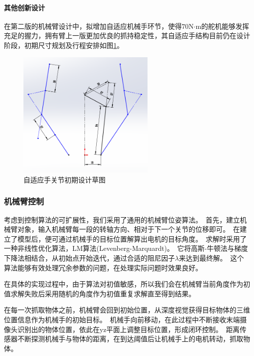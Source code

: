 \paragraph{其他创新设计}

在第二版的机械臂设计中，拟增加自适应机械手环节，使得$70$N$\cdot$m的舵机能够发挥充足的握力，拥有臂上一版更加优良的抓持稳定性，其自适应手结构目前仍在设计阶段，初期尺寸规划及行程安排如图\ref{fig:arm8}。

\begin{figure}[H]
    \centering
    \includegraphics[width = 0.6\textwidth]{images/arm_9.png}
    \caption{自适应手关节初期设计草图}
    \label{fig:arm8}
\end{figure}

\subsubsection{机械臂控制}

考虑到控制算法的可扩展性，我们采用了通用的机械臂位姿算法。\ 首先，建立机械臂对象，输入机械臂每一段的转轴方向、相对于下一个关节的位移即可。\ 在建立了模型后，便可通过机械手的目标位置解算出电机的目标角度。\ 求解时采用了一种非线性优化算法，LM算法(Levenberg-Marquardt)\cite{more1978levenberg}。\ 它将高斯-牛顿法与梯度下降法相结合，从初始点开始迭代，通过合适的阻尼因子$\lambda$来达到最终解。\ 这个算法能够有效处理冗余参数的问题，在处理实际问题时效果良好。\ 

在具体的实现过程中，由于算法对初值敏感，所以我们会在机械臂当前角度作为初值求解失败后采用随机的角度作为初值重复求解直至得到结果。\ 

在每一次抓取物体之前，机械臂会回到初始位置，从深度视觉获得目标物体的三维位置信息作为机械手的初始目标。\ 机械手向前移动，在此过程中不断接收末端摄像头识别出的物体位置，依此在yz平面上调整目标位置，形成闭环控制。\ 距离传感器不断探测机械手与物体的距离，在到达阈值后让机械手上的电机转动，抓取物体。\ 

